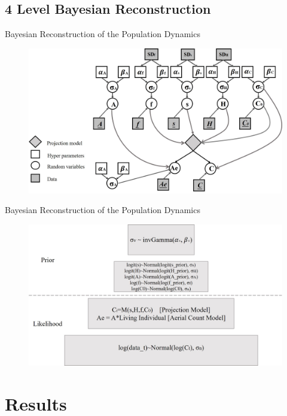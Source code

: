 \documentclass{beamer}
\begin{document}
\subsection{4 Level Bayesian Reconstruction}
\begin{frame}{Bayesian Reconstruction of the Population Dynamics}
	\begin{figure}[ht]
		\centering
		\includegraphics[scale=.25]{fig/Chicago_deer/Bayesian_model_Aerial_count.jpg}
		\label{Bayesian}
	\end{figure}
\end{frame}

\begin{frame}{Bayesian Reconstruction of the Population Dynamics}
	\begin{figure}[ht]
		\centering
		\includegraphics[scale=.25]{fig/Chicago_deer/Bayesian_model_4level_aerial.jpg}
		\label{4level}
	\end{figure}
\end{frame}

\section{Results}
\end{document}
